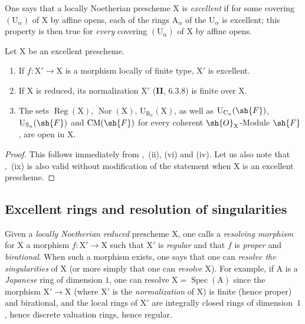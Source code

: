 \begin{env}[7.8.5]
\label{IV.7.8.5}
One says that a locally Noetherian prescheme $\mathrm{X}$ is \emph{excellent} if for some covering $(\mathrm{U}_\alpha)$ of $\mathrm{X}$ by affine opens, each of the rings $\mathrm{A}_\alpha$ of the $\mathrm{U}_\alpha$ is excellent; this property is then true for \emph{every} covering $(\mathrm{U}_\alpha)$ of $\mathrm{X}$ by affine opens.
\end{env}

\begin{proposition}[7.8.6]
\label{IV.7.8.6}
Let $\mathrm{X}$ be an excellent prescheme.
\begin{enumerate}[label=(\roman*)]
  \item If $f:\mathrm{X}'\to\mathrm{X}$ is a morphism locally of finite type, $\mathrm{X}'$ is excellent.


  \item If $\mathrm{X}$ is reduced, its normalization $\mathrm{X}'$ (\textbf{II}, $6.3.8$) is finite over $\mathrm{X}$.
  \item The sets $\operatorname{Reg}(\mathrm{X})$, $\operatorname{Nor}(\mathrm{X})$, $\mathrm{U}_{\mathrm{R}_n}(\mathrm{X})$, as well as $\mathrm{U}_{\mathrm{C}_n}(\sh{F})$, $\mathrm{U}_{\mathrm{S}_n}(\sh{F})$ and $\mathrm{CM}(\sh{F})$ for every coherent $\sh{O}_\mathrm{X}$-Module $\sh{F}$, are open in $\mathrm{X}$.
\end{enumerate}
\end{proposition}

\begin{proof}
This follows immediately from ,~(ii), (vi) and (iv). Let us also note that ,~(ix) is also valid without modification of the statement when $\mathrm{X}$ is an excellent prescheme.
\end{proof}


\subsection{Excellent rings and resolution of singularities}
\label{subsection:IV.7.9}

\begin{env}[7.9.1]
\label{IV.7.9.1}
Given a \emph{locally Noetherian reduced} prescheme $\mathrm{X}$, one calls a \emph{resolving morphism} for $\mathrm{X}$ a morphism $f:\mathrm{X}'\to\mathrm{X}$ such that $\mathrm{X}'$ is \emph{regular} and that $f$ is \emph{proper} and \emph{birational}. When such a morphism exists, one says that one can \emph{resolve the singularities} of $\mathrm{X}$ (or more simply that one can \emph{resolve} $\mathrm{X}$). For example, if $\mathrm{A}$ is a \emph{Japanese} ring of dimension $1$, one can resolve $\mathrm{X}=\operatorname{Spec}(\mathrm{A})$ since the morphism $\mathrm{X}'\to\mathrm{X}$ (where $\mathrm{X}'$ is the \emph{normalization} of $\mathrm{X}$) is finite (hence proper) and birational, and the local rings of $\mathrm{X}'$ are integrally closed rings of dimension~$1$, hence discrete valuation rings, hence regular.
\end{env}

